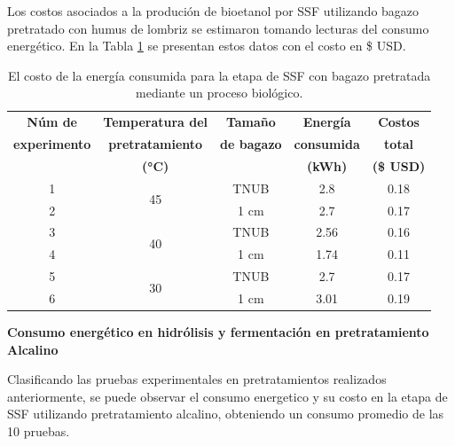 \documentclass[12pt]{article}
\begin{document}
	Los costos asociados a la produción de bioetanol por SSF utilizando bagazo pretratado con humus de lombriz se estimaron tomando lecturas del consumo energético. En la Tabla \ref{pruebbio} se presentan estos datos con el costo en \$ USD.
	

	\begin{table}[H]
	\centering
	\caption{El costo de la energía consumida para la etapa de SSF con bagazo pretratada mediante un proceso biológico. }
	\label{pruebbio}
	{\fontsize{9}{10.8}\selectfont %
		\begin{tabular}{|c|c|c|c|c|}
			\hline
			\textbf{Núm de}&\textbf{Temperatura del} & \textbf{Tamaño } & \textbf{Energía } & \textbf{Costos } \\ 
		\textbf{experimento}&\textbf{pretratamiento} &	\textbf{ de bagazo}   & 	\textbf{consumida  }& 	\textbf{ total} \\ 
		&	\textbf{(°C)}  &    & \textbf{(kWh)} & \textbf{(\$ USD)} \\ \hline
	1	&	\multirow{2}{*}{45}& TNUB & 2.8 & 0.18 \\  \cline{3-5} \cline{1-1}
	2	&	& 1 cm & 2.7 & 0.17  \\ \hline 
	3	&	\multirow{2}{*}{40} & TNUB & 2.56 & 0.16  \\ \cline{3-5}\cline{1-1}
	4	&	& 1 cm & 1.74 & 0.11  \\ \hline
	5	&	\multirow{2}{*}{30}	& TNUB & 2.7 & 0.17  \\ \cline{3-5}\cline{1-1}
	6	&	& 1 cm & 3.01 & 0.19  \\ \hline
			
		\end{tabular}
	}
\end{table}




	
		\textbf{ Consumo energético en hidrólisis y fermentación en pretratamiento Alcalino }
	
	Clasificando las pruebas experimentales en pretratamientos realizados anteriormente, se puede observar el consumo energetico y su costo en la etapa de SSF utilizando pretratamiento alcalino, obteniendo un consumo promedio de las 10 pruebas.	
	
\end{document}
